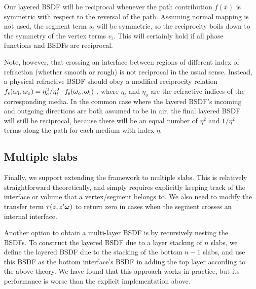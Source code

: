 Our layered BSDF will be reciprocal whenever the path contribution $f(\bar x)$ is symmetric with respect to the reversal of the path. Assuming normal mapping is not used, the segment term $s_i$ will be symmetric, so the reciprocity boils down to the symmetry of the vertex terms $v_i$. This will certainly hold if all phase functions and BSDFs are reciprocal.

Note, however, that crossing an interface between regions of different index of refraction (whether smooth or rough) is not reciprocal in the usual sense. Instead, a physical refractive BSDF should obey a modified reciprocity relation $f_\mathrm{s}(\bm\omega_\mathrm{i}, \bm\omega_\mathrm{o}) = \eta_o^2 / \eta_i^2 \cdot f_\mathrm{s}(\bm\omega_\mathrm{o}, \bm\omega_\mathrm{i})$ \cite{walter2007microfacet}, where $\eta_i$ and $\eta_o$ are the refractive indices of the corresponding media. In the common case where the layered BSDF's incoming and outgoing directions are both assumed to be in air, the final layered BSDF will still be reciprocal, because there will be an equal number of $\eta^2$ and $1/\eta^2$ terms along the path for each medium with index $\eta$.


\subsection{Multiple slabs}
\label{subsec:multi_layer}

Finally, we support extending the framework to multiple slabs. This is relatively straightforward theoretically, and simply requires explicitly keeping track of the interface or volume that a vertex/segment belongs to. We also need to modify the transfer term $\tau(z,z'\bm\omega)$ to return zero in cases when the segment crosses an internal interface.

Another option to obtain a multi-layer BSDF is by recursively nesting the BSDFs. To construct the layered BSDF due to a layer stacking of $n$ slabs, we define the layered BSDF due to the stacking of the bottom $n-1$ slabs, and use this BSDF as the bottom interface's BSDF in adding the top layer according to the above theory. We have found that this approach works in practice, but its performance is worse than the explicit implementation above.


